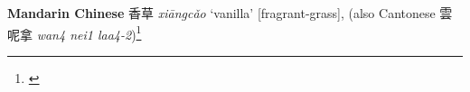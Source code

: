 \begin{etymology}\label{ety:xiangcao}
\textbf{Mandarin Chinese} {香草} \textit{xiāngcǎo} `vanilla' [fragrant-grass], (also Cantonese 雲呢拿 \textit{wan4 nei1 laa4-2})\footnote{\textcite{mdbg}}
\end{etymology}